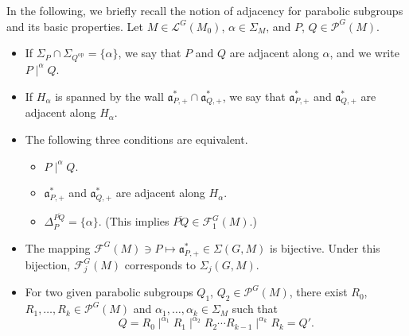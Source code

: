 \documentclass[12pt]{amsart}
\theoremstyle{definition}
\theoremstyle{plain}
\theoremstyle{remark}
\newcommand{\fa}{\mathfrak{a}}
\newcommand{\cF}{\mathcal{F}}
\newcommand{\cL}{\mathcal{L}}
\newcommand{\cP}{\mathcal{P}}
\numberwithin{equation}{section}
\newcommand{\op}{\mathrm{op}}
\begin{document}
In the following, we briefly recall the notion of adjacency for parabolic subgroups and its basic properties.
Let $M \in \cL^G(M_0)$, $\alpha\in\Sigma_M$, and $P$, $Q\in\cP^G(M)$.
\begin{itemize}
    \item If $\Sigma_P\cap\Sigma_{Q^\op}=\{\alpha\}$, we say that $P$ and $Q$ are adjacent along $\alpha$, and we write $P\mid^\alpha Q$. 
    \item If $H_\alpha$ is spanned by the wall $\fa^*_{P,+}\cap \fa^*_{Q,+}$, we say that $\fa^*_{P,+}$ and $\fa^*_{Q,+}$ are adjacent along $H_\alpha$. 
    \item The following three conditions are equivalent. 
    \begin{itemize}
        \item $P\mid^\alpha Q$.
        \item $\fa^*_{P,+}$ and $\fa^*_{Q,+}$ are adjacent along $H_\alpha$. 
        \item $\Delta_{P}^{\overline{PQ}}=\{\alpha\}$. (This implies $\overline{PQ}\in\cF^G_1(M)$.) 
    \end{itemize}
    \item The mapping $\cF^G(M)\ni P\mapsto \fa^*_{P,+}\in\Sigma(G,M)$ is bijective. 
Under this bijection, $\cF_j^G(M)$ corresponds to $\Sigma_j(G,M)$. 
    \item For two given parabolic subgroups $Q_1$, $Q_2\in\cP^G(M)$, there exist $R_0$, $R_1,\dots,R_k\in\cP^G(M)$ and $\alpha_1,\dots,\alpha_k\in\Sigma_M$ such that
\[
Q=R_0\mid^{\alpha_1}R_1\mid^{\alpha_2}R_2 \cdots R_{k-1}\mid^{\alpha_k} R_k=Q'.
\]
\end{itemize}
\end{document}
